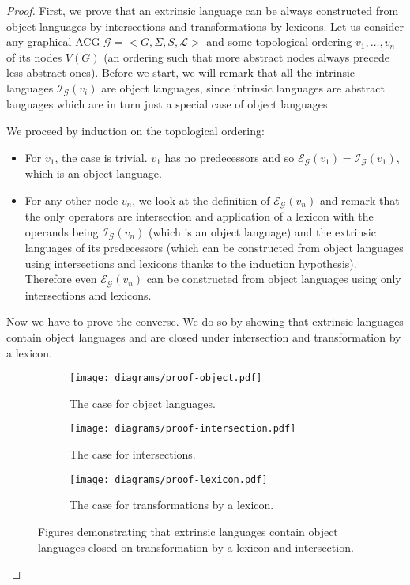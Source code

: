 \begin{proof}
  First, we prove that an extrinsic language can be always constructed
  from object languages by intersections and transformations by
  lexicons. Let us consider any graphical ACG $\mathcal{G} =
  \mathopen{<} G, \Sigma, S, \mathcal{L} \mathclose{>}$ and some
  topological ordering $v_1, \ldots, v_n$ of its nodes $V(G)$ (an
  ordering such that more abstract nodes always precede less abstract
  ones). Before we start, we will remark that all the intrinsic
  languages $\mathcal{I}_{\mathcal{G}}(v_i)$ are object languages, since
  intrinsic languages are abstract languages which are in turn just a
  special case of object languages.

  We proceed by induction on the topological ordering:

  \begin{itemize}
    \item For $v_1$, the case is trivial. $v_1$ has no predecessors and
      so $\mathcal{E}_{\mathcal{G}}(v_1) =
      \mathcal{I}_{\mathcal{G}}(v_1)$, which is an object language.
    \item For any other node $v_n$, we look at the definition of
      $\mathcal{E}_{\mathcal{G}}(v_n)$ and remark that the only
      operators are intersection and application of a lexicon with the
      operands being $\mathcal{I}_{\mathcal{G}}(v_n)$ (which is an
      object language) and the extrinsic languages of its predecessors
      (which can be constructed from object languages using
      intersections and lexicons thanks to the induction
      hypothesis). Therefore even $\mathcal{E}_{\mathcal{G}}(v_n)$ can
      be constructed from object languages using only intersections and
      lexicons.
  \end{itemize}


  Now we have to prove the converse. We do so by showing that extrinsic
  languages contain object languages and are closed under intersection
  and transformation by a lexicon.

  \begin{figure}
    \centering
    \begin{subfigure}[b]{0.2\textwidth}
      \centering
      \texttt{[image: diagrams/proof-object.pdf]}
      \caption{\label{fig:proof-object} The case for object languages.}
    \end{subfigure}
    \quad
    \begin{subfigure}[b]{0.4\textwidth}
      \centering
      \texttt{[image: diagrams/proof-intersection.pdf]}
      \caption{\label{fig:proof-intersection} The case for intersections.}
    \end{subfigure}
    \quad
    \begin{subfigure}[b]{0.3\textwidth}
      \centering
      \texttt{[image: diagrams/proof-lexicon.pdf]}
      \caption{\label{fig:proof-lexicon} The case for transformations by
        a lexicon.}
    \end{subfigure}
    \caption{Figures demonstrating that extrinsic languages contain
      object languages closed on transformation by a lexicon and
      intersection.}
  \end{figure}


\end{proof}
